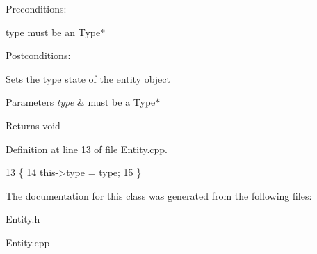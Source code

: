 Preconditions\+:
\begin{DoxyItemize}
\item type must be an Type$\ast$
\end{DoxyItemize}

Postconditions\+:
\begin{DoxyItemize}
\item Sets the type state of the entity object
\end{DoxyItemize}


\begin{DoxyParams}{Parameters}
{\em type} & must be a Type$\ast$ \\
\hline
\end{DoxyParams}
\begin{DoxyReturn}{Returns}
void 
\end{DoxyReturn}


Definition at line 13 of file Entity.\+cpp.


\begin{DoxyCode}
13                                \{
14     this->type = type;
15 \}
\end{DoxyCode}


The documentation for this class was generated from the following files\+:\begin{DoxyCompactItemize}
\item 
Entity.\+h\item 
Entity.\+cpp\end{DoxyCompactItemize}
